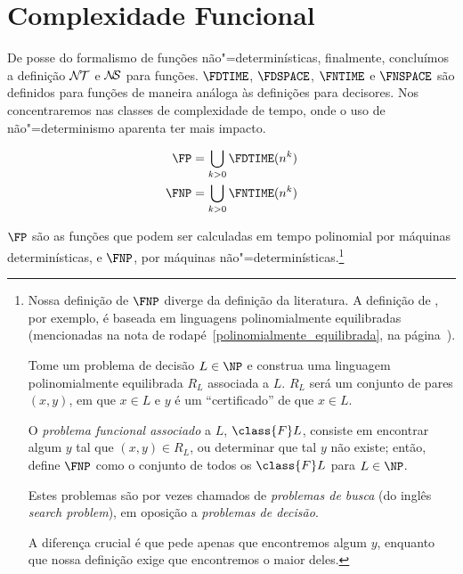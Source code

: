 \section{Complexidade Funcional}

De posse do formalismo de funções não"=determinísticas,
finalmente,
concluímos a definição ${\mathcal{N\!T}}$ e ${\mathcal{N\!\!S}}$ para funções.
$\FDTIME$, $\FDSPACE$, $\FNTIME$ e $\FNSPACE$
são definidos para funções de maneira análoga às definições para decisores.
Nos concentraremos nas classes de complexidade de tempo,
onde o uso de não"=determinismo aparenta ter mais impacto.

\begin{definition}
    \begin{align*}
        \FP &= \bigcup_{k > 0} \FDTIME(n^k) \\
        \FNP &= \bigcup_{k > 0} \FNTIME(n^k)
    \end{align*}
\end{definition}

$\FP$ são as funções que podem ser calculadas
em tempo polinomial por máquinas determinísticas,
e $\FNP$, por máquinas não"=determinísticas.\footnote{
    Nossa definição de $\FNP$ diverge da definição da literatura.
    A definição de ,
    por exemplo,
    é baseada em linguagens polinomialmente equilibradas
    (mencionadas na nota de rodapé~\ref{polinomialmente_equilibrada},
    na página~\pageref{polinomialmente_equilibrada}).

    Tome um problema de decisão $L \in \NP$
    e construa uma linguagem polinomialmente equilibrada $R_L$ associada a $L$.
    $R_L$ será um conjunto de pares $(x, y)$,
    em que $x \in L$ e $y$ é um ``certificado'' de que $x \in L$.

    O \emph{problema funcional associado} a $L$, $\class{F}L$,
    consiste em encontrar algum $y$ tal que $(x, y) \in R_L$,
    ou determinar que tal $y$ não existe;
    então,
     define $\FNP$
    como o conjunto de todos os $\class{F}L$
    para $L \in \NP$.

    Estes problemas são por vezes chamados de \emph{problemas de busca}
    (do inglês \emph{search problem}),
    em oposição a \emph{problemas de decisão}.

    A diferença crucial é que 
    pede apenas que encontremos algum $y$,
    enquanto que nossa definição exige que encontremos o maior deles.
}

